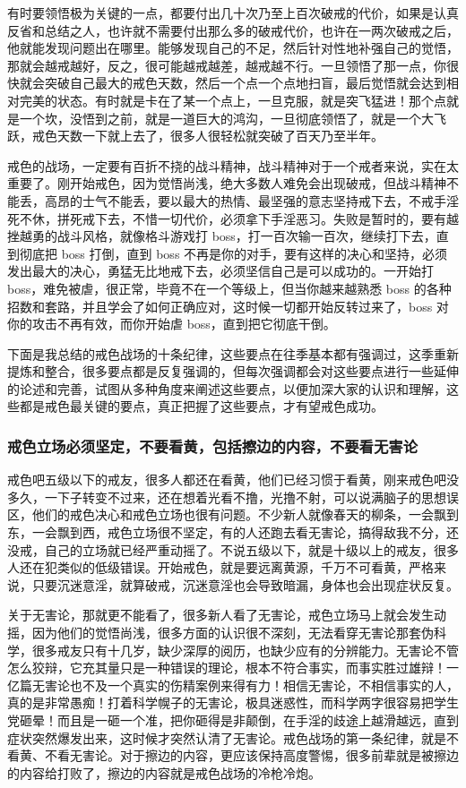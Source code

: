 有时要领悟极为关键的一点，都要付出几十次乃至上百次破戒的代价，如果是认真反省和总结之人，也许就不需要付出那么多的破戒代价，也许在一两次破戒之后，他就能发现问题出在哪里。能够发现自己的不足，然后针对性地补强自己的觉悟，那就会越戒越好，反之，很可能越戒越差，越戒越不行。一旦领悟了那一点，你很快就会突破自己最大的戒色天数，然后一个点一个点地扫盲，最后觉悟就会达到相对完美的状态。有时就是卡在了某一个点上，一旦克服，就是突飞猛进！那个点就是一个坎，没悟到之前，就是一道巨大的鸿沟，一旦彻底领悟了，就是一个大飞跃，戒色天数一下就上去了，很多人很轻松就突破了百天乃至半年。

戒色的战场，一定要有百折不挠的战斗精神，战斗精神对于一个戒者来说，实在太重要了。刚开始戒色，因为觉悟尚浅，绝大多数人难免会出现破戒，但战斗精神不能丢，高昂的士气不能丢，要以最大的热情、最坚强的意志坚持戒下去，不戒手淫死不休，拼死戒下去，不惜一切代价，必须拿下手淫恶习。失败是暂时的，要有越挫越勇的战斗风格，就像格斗游戏打 boss，打一百次输一百次，继续打下去，直到彻底把 boss 打倒，直到 boss 不再是你的对手，要有这样的决心和坚持，必须发出最大的决心，勇猛无比地戒下去，必须坚信自己是可以成功的。一开始打 boss，难免被虐，很正常，毕竟不在一个等级上，但当你越来越熟悉 boss 的各种招数和套路，并且学会了如何正确应对，这时候一切都开始反转过来了，boss 对你的攻击不再有效，而你开始虐 boss，直到把它彻底干倒。

下面是我总结的戒色战场的十条纪律，这些要点在往季基本都有强调过，这季重新提炼和整合，很多要点都是反复强调的，但每次强调都会对这些要点进行一些延伸的论述和完善，试图从多种角度来阐述这些要点，以便加深大家的认识和理解，这些都是戒色最关键的要点，真正把握了这些要点，才有望戒色成功。

\subsubsection{戒色立场必须坚定，不要看黄，包括擦边的内容，不要看无害论}

戒色吧五级以下的戒友，很多人都还在看黄，他们已经习惯于看黄，刚来戒色吧没多久，一下子转变不过来，还在想着光看不撸，光撸不射，可以说满脑子的思想误区，他们的戒色决心和戒色立场也很有问题。不少新人就像春天的柳条，一会飘到东，一会飘到西，戒色立场很不坚定，有的人还跑去看无害论，搞得敌我不分，还没戒，自己的立场就已经严重动摇了。不说五级以下，就是十级以上的戒友，很多人还在犯类似的低级错误。开始戒色，就是要远离黄源，千万不可看黄，严格来说，只要沉迷意淫，就算破戒，沉迷意淫也会导致暗漏，身体也会出现症状反复。

关于无害论，那就更不能看了，很多新人看了无害论，戒色立场马上就会发生动摇，因为他们的觉悟尚浅，很多方面的认识很不深刻，无法看穿无害论那套伪科学，很多戒友只有十几岁，缺少深厚的阅历，也缺少应有的分辨能力。无害论不管怎么狡辩，它充其量只是一种错误的理论，根本不符合事实，而事实胜过雄辩！一亿篇无害论也不及一个真实的伤精案例来得有力！相信无害论，不相信事实的人，真的是非常愚痴！打着科学幌子的无害论，极具迷惑性，而科学两字很容易把学生党砸晕！而且是一砸一个准，把你砸得是非颠倒，在手淫的歧途上越滑越远，直到症状突然爆发出来，这时候才突然认清了无害论。戒色战场的第一条纪律，就是不看黄、不看无害论。对于擦边的内容，更应该保持高度警惕，很多前辈就是被擦边的内容给打败了，擦边的内容就是戒色战场的冷枪冷炮。

